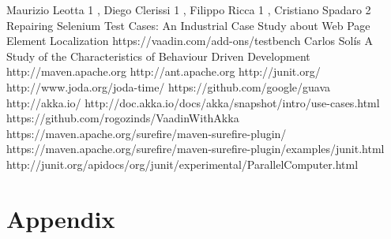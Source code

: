 \documentclass[12pt,a4paper,english%
]{tutthesis}
\begin{document}
\begin{thebibliography}{7}
		Maurizio Leotta 1 , Diego Clerissi 1 , Filippo Ricca 1 , Cristiano Spadaro 2
		Repairing Selenium Test Cases: An Industrial Case Study about Web Page Element
		Localization
		https://vaadin.com/add-ons/testbench
		 Carlos Solís 
		A Study of the Characteristics of Behaviour Driven Development
		http://maven.apache.org
		http://ant.apache.org
		http://junit.org/
		http://www.joda.org/joda-time/
		https://github.com/google/guava
		http://akka.io/
		http://doc.akka.io/docs/akka/snapshot/intro/use-cases.html
		https://github.com/rogozinds/VaadinWithAkka
		https://maven.apache.org/surefire/maven-surefire-plugin/
		https://maven.apache.org/surefire/maven-surefire-plugin/examples/junit.html
		http://junit.org/apidocs/org/junit/experimental/ParallelComputer.html
	\end{thebibliography}
  \section {Appendix}
\end{document}
